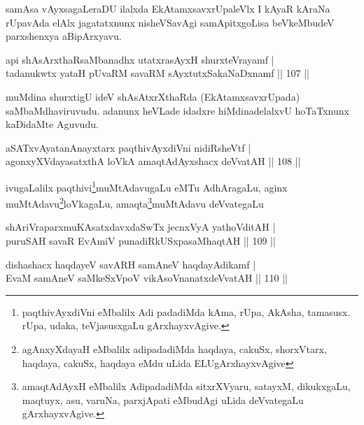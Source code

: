 \begin{artha}
samAsa vAyxsagaLeraDU ilalxda EkAtamxsavxrUpaleVlx I kAyaR kAraNa rUpavAda elAlx jagatatxnunx nisheVSavAgi samApitxgoLisa beVkeMbudeV parxshenxya aBipArxyavu.
\end{artha}

\begin{shl}
api shAsArxthaRsaMbanadhx utatxrasAyxH shurxteVrayamf |\\
tadanukwtx yataH pUvaRM savaRM sAyxtutxSakaNaDxnamf \hfill || 107 ||
\end{shl}

\begin{artha}
muMdina shurxtigU ideV shAsAtxrXthaRda (EkAtamxsavxrUpada) saMbaMdhaviruvudu. adanunx heVLade idadxre hiMdinadelalxvU hoTaTxnunx kaDidaMte Aguvudu.
\end{artha}


\begin{shl}
aSATxvAyatanAnayxtarx paqthivAyxdiVni nidiRsheVtf |\\
agonxyXVdayasatxthA loVkA amaqtAdAyxshacx deVvatAH \hfill || 108 ||
\end{shl}

\begin{artha}
ivugaLalilx paqthivi\footnote{paqthivAyxdiVni eMbalilx Adi padadiMda kAma, rUpa, AkAsha, tamasusx. rUpa, udaka, teVjasusxgaLu gArxhayxvAgive.}muMtAdavugaLu eMTu AdhAragaLu, aginx muMtAdavu\footnote{agAnxyXdayaH eMbalilx adipadadiMda haqdaya, cakuSx, shorxVtarx, haqdaya, cakuSx, haqdaya eMdu uLida ELUgArxhayxvAgive}loVkagaLu, amaqta\footnote{amaqtAdAyxH eMbalilx AdipadadiMda sitxrXVyaru, satayxM, dikukxgaLu, maqtuyx, asu, varuNa, parxjApati eMbudAgi uLida deVvategaLu gArxhayxvAgive.}muMtAdavu deVvategaLu 
\end{artha}

\begin{shl}
shAriVraparxmuKAsatxdavxdaSwTx jecnxVyA yathoVditAH |\\
puruSAH savaR EvAmiV punadiRkUSxpasaMhaqtAH \hfill || 109 ||
\end{shl}

\begin{shl}
dishashacx haqdayeV savARH samAneV haqdayAdikamf |\\
EvaM samAneV saMkeSxVpoV vikAsoV\s nanatxdeVvatAH \hfill || 110 ||
\end{shl}

